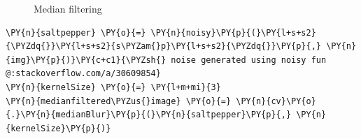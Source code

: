 \documentclass[a4paper,10pt]{article}%
\begin{document}
\begin{figure}[!h]
	\centering
	\caption{Median filtering }
\end{figure}

    \begin{tcolorbox}[breakable, size=fbox, boxrule=1pt, pad at break*=1mm,colback=cellbackground, colframe=cellborder]
\begin{Verbatim}[commandchars=\\\{\}]
\PY{n}{saltpepper} \PY{o}{=} \PY{n}{noisy}\PY{p}{(}\PY{l+s+s2}{\PYZdq{}}\PY{l+s+s2}{s\PYZam{}p}\PY{l+s+s2}{\PYZdq{}}\PY{p}{,} \PY{n}{img}\PY{p}{)}\PY{c+c1}{\PYZsh{} noise generated using noisy fun @:stackoverflow.com/a/30609854}
\PY{n}{kernelSize} \PY{o}{=} \PY{l+m+mi}{3}
\PY{n}{medianfiltered\PYZus{}image} \PY{o}{=} \PY{n}{cv}\PY{o}{.}\PY{n}{medianBlur}\PY{p}{(}\PY{n}{saltpepper}\PY{p}{,} \PY{n}{kernelSize}\PY{p}{)} 
\end{Verbatim}
\end{tcolorbox}
\end{document}
